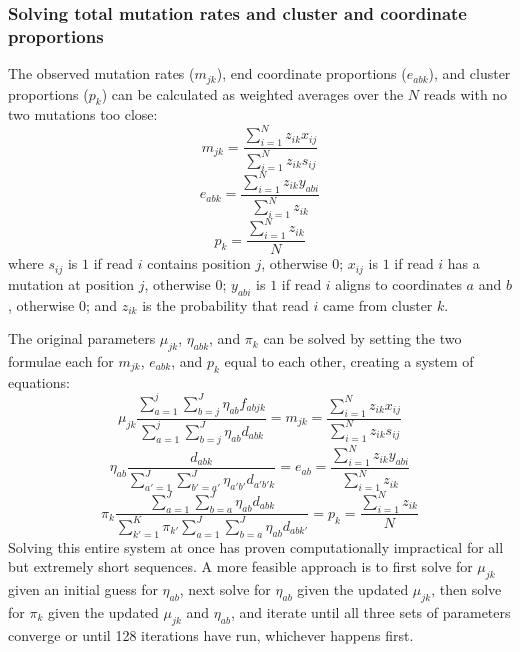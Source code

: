 \documentclass{article}
\begin{document}
\subsubsection{Solving total mutation rates and cluster and coordinate proportions}
\label{calc_params}

The observed mutation rates ($m_{jk}$), end coordinate proportions ($e_{abk}$), and cluster proportions ($p_k$) can be calculated as weighted averages over the $N$ reads with no two mutations too close:
\begin{equation}
    m_{jk} = \frac{\sum_{i=1}^{N} z_{ik} x_{ij}}{\sum_{i=1}^{N} z_{ik} s_{ij}}
\end{equation}
\begin{equation}
    e_{abk} = \frac{\sum_{i=1}^{N} z_{ik} y_{abi}}{\sum_{i=1}^{N} z_{ik}}
\end{equation}
\begin{equation}
    p_k = \frac{\sum_{i=1}^{N} z_{ik}}{N}
\end{equation}
where $s_{ij}$ is $1$ if read $i$ contains position $j$, otherwise $0$; $x_{ij}$ is $1$ if read $i$ has a mutation at position $j$, otherwise $0$; $y_{abi}$ is $1$ if read $i$ aligns to coordinates $a$ and $b$, otherwise $0$; and $z_{ik}$ is the probability that read $i$ came from cluster $k$.

The original parameters $\mu_{jk}$, $\eta_{abk}$, and $\pi_k$ can be solved by setting the two formulae each for $m_{jk}$, $e_{abk}$, and $p_k$ equal to each other, creating a system of equations:
\begin{equation}
    \mu_{jk} \frac{\sum_{a=1}^{j}\sum_{b=j}^{J}\eta_{ab} f_{abjk}}{\sum_{a=1}^{j}\sum_{b=j}^{J}\eta_{ab}d_{abk}} = m_{jk} = \frac{\sum_{i=1}^{N} z_{ik} x_{ij}}{\sum_{i=1}^{N} z_{ik} s_{ij}}
\end{equation}
\begin{equation}
    \eta_{ab} \frac{d_{abk}}{\sum_{a'=1}^{J} \sum_{b'=a'}^{J} \eta_{a'b'} d_{a'b'k}} = e_{ab} = \frac{\sum_{i=1}^{N} z_{ik} y_{abi}}{\sum_{i=1}^{N} z_{ik}}
\end{equation}
\begin{equation}
    \pi_k \frac{\sum_{a=1}^{J} \sum_{b=a}^{J} \eta_{ab} d_{abk}}{\sum_{k'=1}^{K} \pi_{k'} \sum_{a=1}^{J} \sum_{b=a}^{J} \eta_{ab} d_{abk'}} = p_k = \frac{\sum_{i=1}^{N} z_{ik}}{N}
\end{equation}
Solving this entire system at once has proven computationally impractical for all but extremely short sequences.
A more feasible approach is to first solve for $\mu_{jk}$ given an initial guess for $\eta_{ab}$, next solve for $\eta_{ab}$ given the updated $\mu_{jk}$, then solve for $\pi_k$ given the updated $\mu_{jk}$ and $\eta_{ab}$, and iterate until all three sets of parameters converge or until 128 iterations have run, whichever happens first.
\end{document}
